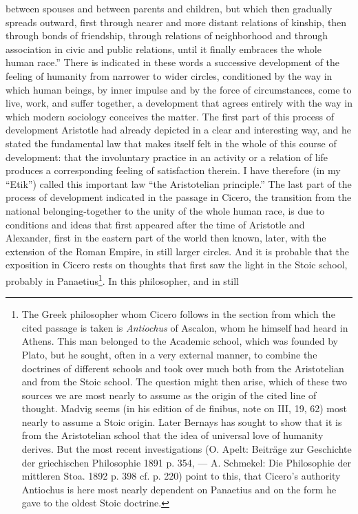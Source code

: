 \documentclass[12pt,a4paper,openany]{book}
\newcommand{\opage}[1]{\marginnote{\footnotesize\textit{[#1]}}}
\begin{document}
between spouses and between parents and children, but which
then gradually spreads outward, first through nearer
and more distant relations of kinship, then through bonds of friendship,
through relations of neighborhood and through association in civic and
public relations, until it finally embraces the whole human race.''
There is indicated in these words a successive development of the
feeling of humanity from narrower to wider circles, conditioned
by the way in which human beings, by inner impulse and by
the force of circumstances, come to live, work, and suffer together,
a development that agrees entirely with the way in
which modern sociology conceives the matter. The first
\opage{171}part of this process of development Aristotle had already depicted
in a clear and interesting way, and he stated the fundamental law
that makes itself felt in the whole of this course of development: that
the involuntary practice in an activity or a relation of life
produces a corresponding feeling of satisfaction therein.
I have therefore (in my ``Etik'') called this important law ``the
Aristotelian principle.'' The last part of the process of development
indicated in the passage in Cicero, the transition from the
national belonging-together to the unity of the whole human race, is due to
conditions and ideas that first appeared after the time of Aristotle and
Alexander, first in the eastern part of the world then known,
later, with the extension of the Roman Empire, in still larger
circles. And it is probable that the exposition in Cicero
rests on thoughts that first saw the light in the Stoic
school, probably in Panaetius\footnote{The Greek philosopher whom Cicero follows in the section from which the
cited passage is taken is \emph{Antiochus} of Ascalon, whom he himself had
heard in Athens. This man belonged to the Academic school, which was
founded by Plato, but he sought, often in a very external manner,
to combine the doctrines of different schools and took over much
both from the Aristotelian and from the Stoic school. The question might then
arise, which of these two sources we are most nearly to
assume as the origin of the cited line of thought. Madvig seems (in his
edition of de finibus, note on III, 19, 62) most nearly to assume a
Stoic origin. Later Bernays has sought to show that it is from
the Aristotelian school that the idea of universal
love of humanity derives. But the most recent investigations (O. Apelt: Beiträge
zur Geschichte der griechischen Philosophie 1891 p. 354, --- A. Schmekel:
Die Philosophie der mittleren Stoa. 1892 p. 398 cf. p. 220) point
to this, that Cicero's authority Antiochus is here most nearly
dependent on Panaetius and on the form he gave to the oldest Stoic
doctrine.}. In this philosopher, and in still
\end{document}
